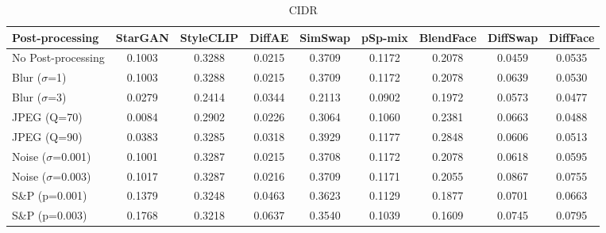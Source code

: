 \documentclass{article}
\begin{document}
\begin{table}[h!]
\begin{subtable}{\textwidth}
\caption{CIDR}
\centering
\scriptsize
\begin{tabular}{lcccccccc}
\toprule
\textbf{Post-processing} & StarGAN & StyleCLIP & DiffAE & SimSwap & pSp-mix & BlendFace & DiffSwap & DiffFace \\
\midrule
No Post-processing & 0.1003 & 0.3288 & 0.0215 & 0.3709 & 0.1172 & 0.2078 & 0.0459 & 0.0535 \\
\midrule
Blur ($\sigma$=1) & 0.1003 & 0.3288 & 0.0215 & 0.3709 & 0.1172 & 0.2078 & 0.0639 & 0.0530 \\
Blur ($\sigma$=3) & 0.0279 & 0.2414 & 0.0344 & 0.2113 & 0.0902 & 0.1972 & 0.0573 & 0.0477 \\
JPEG (Q=70) & 0.0084 & 0.2902 & 0.0226 & 0.3064 & 0.1060 & 0.2381 & 0.0663 & 0.0488 \\
JPEG (Q=90) & 0.0383 & 0.3285 & 0.0318 & 0.3929 & 0.1177 & 0.2848 & 0.0606 & 0.0513 \\
Noise ($\sigma$=0.001) & 0.1001 & 0.3287 & 0.0215 & 0.3708 & 0.1172 & 0.2078 & 0.0618 & 0.0595 \\
Noise ($\sigma$=0.003) & 0.1017 & 0.3287 & 0.0216 & 0.3709 & 0.1171 & 0.2055 & 0.0867 & 0.0755 \\
S\&P (p=0.001) & 0.1379 & 0.3248 & 0.0463 & 0.3623 & 0.1129 & 0.1877 & 0.0701 & 0.0663 \\
S\&P (p=0.003) & 0.1768 & 0.3218 & 0.0637 & 0.3540 & 0.1039 & 0.1609 & 0.0745 & 0.0795 \\
\bottomrule
\end{tabular}
\end{subtable}


\end{table}
\end{document}
